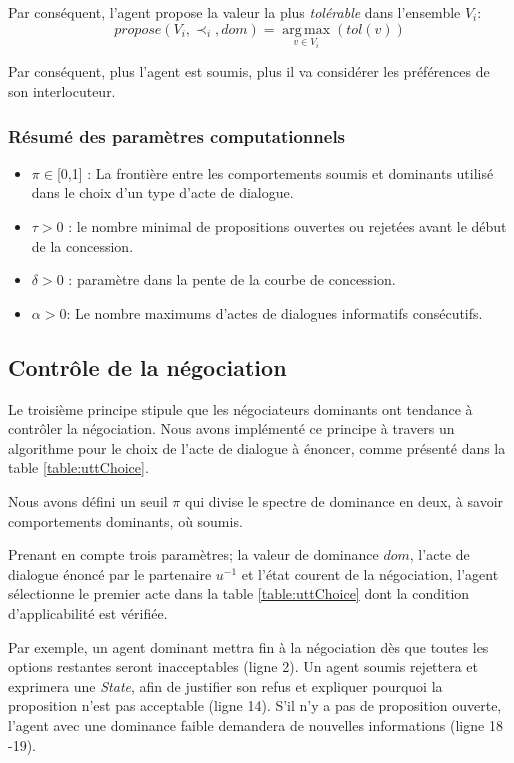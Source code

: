 	\noindent
	Par conséquent, l'agent propose la valeur la plus \emph{tolérable} dans l'ensemble $V_i$:
	\begin{equation}
	propose(V_i, \prec_i,dom) =  \operatorname*{arg\,max}_{v \in V_i} ( tol(v))
	\end{equation}
	
	Par conséquent, plus l'agent est soumis, plus il va considérer les préférences de son interlocuteur.
	
	\subsubsection*{Résumé des paramètres computationnels}
	\begin{itemize}[noitemsep]
		
		\item $\pi \in $[0,1] : La frontière entre  les comportements soumis et dominants utilisé dans le choix d'un type d'acte de dialogue.
		\item $\tau > 0$ : le nombre minimal de propositions ouvertes ou rejetées avant le début de la concession.
		\item $\delta > 0$ : paramètre dans la pente de la courbe de concession.
		\item $\alpha> 0$: Le nombre maximums d'actes de dialogues informatifs consécutifs.
	\end{itemize}
	
	\subsection{Contrôle de la négociation}
	\label{chp4:controle}
	
	Le troisième principe stipule que les négociateurs dominants ont tendance à contrôler la négociation.
	Nous avons implémenté ce principe à travers un algorithme pour le choix de l'acte de dialogue à énoncer, comme présenté dans la table \ref{table:uttChoice}.
	
	Nous avons défini un seuil $\pi$  qui divise le spectre de dominance en deux, à savoir comportements dominants, où soumis.
	
	Prenant en compte trois paramètres; la valeur de dominance $dom$, l'acte de dialogue énoncé par le partenaire $u^{-1}$ et l'état courent de la négociation, l'agent sélectionne le premier acte dans la table \ref{table:uttChoice} dont la condition d'applicabilité est vérifiée.  
	
	
	Par exemple, un agent dominant mettra fin à la négociation dès que toutes les options restantes seront inacceptables (ligne 2). Un agent soumis rejettera et exprimera une \emph{State}, afin de justifier son refus et expliquer pourquoi la proposition n'est pas acceptable (ligne 14). S'il n'y a pas de proposition ouverte, l'agent avec une dominance faible demandera de nouvelles informations (ligne 18 -19).
	
